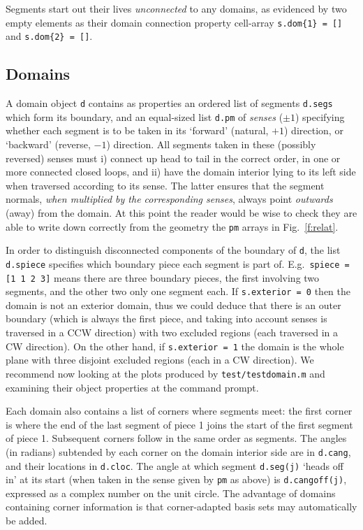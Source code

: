 \documentclass[12pt]{article}
\begin{document}
Segments start out their lives {\em unconnected} to any domains,
as evidenced by two empty elements as their domain connection
property cell-array {\tt s.dom\{1\} = []} and {\tt s.dom\{2\} = []}.

\subsection{Domains}

A domain object {\tt d} contains as properties
an ordered list of segments {\tt d.segs} which form its
boundary, and an equal-sized
list {\tt d.pm} of {\em senses} ($\pm1$)
specifying whether each segment is to be taken in its `forward'
(natural, $+1$) direction, or `backward' (reverse, $-1$) direction.
All segments taken in these (possibly reversed) senses must
i) connect up head to tail in the correct order,
in one or more connected closed loops,
and ii) have the domain interior lying to its left side when traversed
according to its sense.
The latter ensures that the segment normals, {\em when multiplied by the
corresponding senses}, always point {\em outwards} (away) from
the domain.
At this point the reader would be wise to
check they are able to write down correctly from the geometry
the {\tt pm} arrays in Fig.~\ref{f:relat}.

In order to distinguish disconnected components of the boundary of
{\tt d}, the list {\tt d.spiece} specifies which boundary piece each
segment is part of. E.g.\ {\tt spiece = [1 1 2 3]} means
there are three boundary pieces, the first involving
two segments, and the other two only one segment each.
If {\tt s.exterior = 0}
then the domain is not an exterior domain, thus we could deduce that
there is an outer boundary (which is always the first piece, and 
taking into account senses is traversed in a CCW direction)
with two excluded regions (each traversed in a CW direction).
On the other hand, if {\tt s.exterior = 1} the domain is the whole plane
with three disjoint excluded regions (each in a CW direction).
We recommend now looking at the plots produced by
{\tt test/testdomain.m} and examining their object properties
at the command prompt.

Each domain also contains a list of corners where segments meet:
the first corner is where the
end of the last segment of piece 1 joins the start of the first segment
of piece 1. Subsequent corners follow in the same order as segments.
The angles (in radians) subtended by each 
corner on the domain interior side are in {\tt d.cang}, and their
locations in {\tt d.cloc}.
The angle at which segment {\tt d.seg(j)}
`heads off in' at its start (when taken in the sense given by
{\tt pm} as above) is {\tt d.cangoff(j)},
expressed as a complex number on the unit circle.
The advantage of domains containing corner information is that
corner-adapted basis sets may automatically be added.
\end{document}
